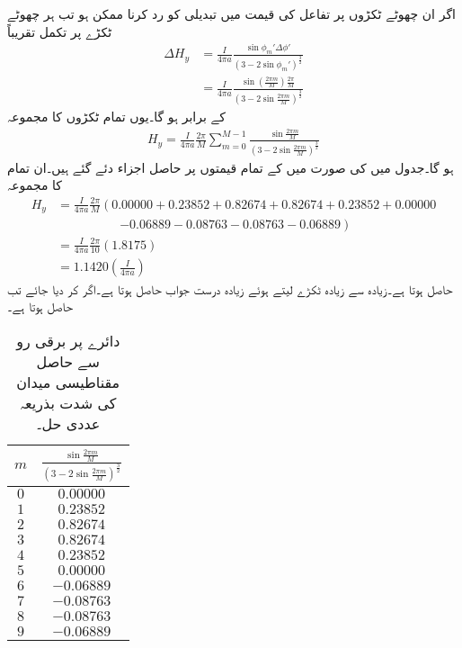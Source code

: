 اگر ان چھوٹے ٹکڑوں پر تفاعل کی قیمت میں تبدیلی کو رد کرنا ممکن ہو تب ہر چھوٹے ٹکڑے پر تکمل تقریباً
\begin{align*}
\Delta H_y&=\frac{I}{4\pi a} \frac{\sin \phi_m' \Delta \phi'}{\left(3-2\sin \phi_m'\right)^{\frac{3}{2}}} \\
&=\frac{I}{4\pi a} \frac{\sin (\frac{2\pi m}{M}) \frac{2\pi}{M}}{\left(3-2\sin   \frac{2\pi m}{M}\right)^{\frac{3}{2}}} 
\end{align*}
کے برابر ہو گا۔یوں تمام ٹکڑوں کا مجموعہ
\begin{align*}
H_y= \frac{I}{4\pi a} \frac{2\pi}{M} \sum_{m=0}^{M-1}\frac{\sin  \frac{2\pi m}{M} }{\left(3-2\sin  \frac{2\pi m}{M}\right)^{\frac{3}{2}}}
\end{align*}
ہو گا۔جدول  میں  کی صورت میں  کے تمام قیمتوں پر حاصل   اجزاء دئے گئے ہیں۔ان تمام کا مجموعہ
\begin{align*}
H_y&=\frac{I}{4\pi a} \frac{2\pi}{M} \left(0.00000+0.23852 +  0.82674 +  0.82674  + 0.23852  + 0.00000 \right.  \\
& \quad \quad \quad \quad \quad \left.-0.06889  -0.08763  -0.08763  -0.06889\right)\\
&=\frac{I}{4\pi a}\frac{2\pi}{10} (1.8175)\\
&=1.1420 \left(\frac{ I}{4\pi a}\right)
\end{align*}
حاصل ہوتا ہے۔زیادہ سے زیادہ ٹکڑے لیتے ہوئے زیادہ درست جواب حاصل ہوتا ہے۔اگر  کر دیا جائے تب   حاصل ہوتا ہے۔
\begin{table}
\centering
\begin{tabular}{c c}
$m$& $\frac{\sin  \frac{2\pi m}{M}}{\left(3-2\sin  \frac{2\pi m}{M}\right)^{\frac{3}{2}}}$\\[3ex]
\hline
$0$& $0.00000$\\
$1$& $0.23852$\\
$2$&$0.82674 $\\
$3$& $0.82674$\\
$4$& $0.23852$\\
$5$& $0.00000$\\
$6$& $-0.06889$\\
$7$&$-0.08763$\\
$8$& $ -0.08763$\\
$9$& $-0.06889$
\end{tabular}
\caption{دائرے پر برقی رو سے حاصل مقناطیسی میدان کی شدت بذریعہ عددی حل۔}
\label{جدول_مقناطیسی_دائرہ_مقناطیسی_شدت_عددی_حل}
\end{table}

